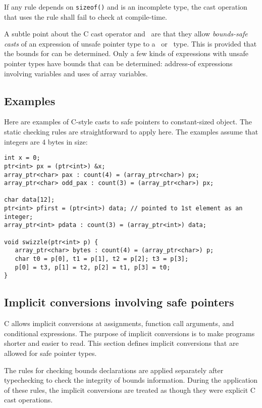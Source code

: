 If any rule depends on \texttt{sizeof()} and  is
an incomplete type, the cast operation that uses the rule shall fail
to check at compile-time.

A subtle point about the C cast operator and \dynamicboundscast\
are that they allow {\em bounds-safe casts} of an expression
 of unsafe pointer type to a \spanptr\ or
\arrayptr\ type. This is provided that the bounds for 
can be determined. Only a few kinds of expressions with unsafe pointer
types have bounds that can be determined: address-of expressions
involving variables and uses of array variables.

\subsection{Examples}
\label{section:pointer-cast-examples}

Here are examples of C-style casts to safe pointers to
constant-sized object. The static checking rules are straightforward
to apply here.  The examples assume that integers are
4 bytes in size:
\begin{verbatim}
int x = 0;
ptr<int> px = (ptr<int>) &x;
array_ptr<char> pax : count(4) = (array_ptr<char>) px;
array_ptr<char> odd_pax : count(3) = (array_ptr<char>) px;

char data[12];
ptr<int> pfirst = (ptr<int>) data; // pointed to 1st element as an integer;
array_ptr<int> pdata : count(3) = (array_ptr<int>) data;

void swizzle(ptr<int> p) {
   array_ptr<char> bytes : count(4) = (array_ptr<char>) p;
   char t0 = p[0], t1 = p[1], t2 = p[2]; t3 = p[3];
   p[0] = t3, p[1] = t2, p[2] = t1, p[3] = t0;
}
\end{verbatim}

\subsection{Implicit conversions involving safe pointers}
\label{section:implicit-conversions}

C allows implicit conversions at assignments, function call arguments,
and conditional expressions.  The purpose of
implicit conversions is to make programs shorter and easier to
read.  This section defines implicit conversions that are
allowed for safe pointer types.

The rules for checking bounds declarations are applied separately after 
typechecking to check the integrity of bounds information.  During the 
application of these rules, the implicit conversions are treated as
though they were explicit C cast operations.


